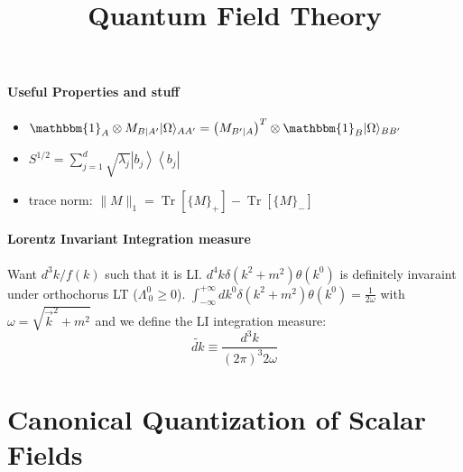 \paragraph{Useful Properties and stuff}
\begin{itemize}
  \item $\mathbbm{1}_A \otimes M_{B \mid A^{\prime}}|\Omega\rangle_{A A^{\prime}}=\left(M_{B^{\prime} \mid A}\right)^T \otimes \mathbbm{1}_B|\Omega\rangle_{B B^{\prime}}$
  \item $S^{1 / 2}=\sum_{j=1}^d \sqrt{\lambda_j}\left|b_j\right\rangle\left\langle b_j\right|$
  \item trace norm: $\|M\|_1=\operatorname{Tr}\left[\{M\}_{+}\right]-\operatorname{Tr}\left[\{M\}_{-}\right]$
\end{itemize}



\title{Quantum Field Theory}
\date{}
\maketitle

\paragraph{Lorentz Invariant Integration measure} Want $d^3 k / f(k)$ such that it is LI. $d^4 k \delta\left(k^2+m^2\right) \theta\left(k^0\right)$
is definitely invaraint under orthochorus LT ($\Lambda_{\ 0}^{0}\geq0$). 
$\int_{-\infty}^{+\infty} d k^0 \delta\left(k^2+m^2\right) \theta\left(k^0\right)=\frac{1}{2 \omega}$ with $\omega= \sqrt{\vec{k}^2 +m^2}$ and we define 
the LI integration measure: $$\widetilde{d k} \equiv \frac{d^3 k}{(2 \pi)^3 2 \omega}$$


\section{Canonical Quantization of Scalar Fields}


